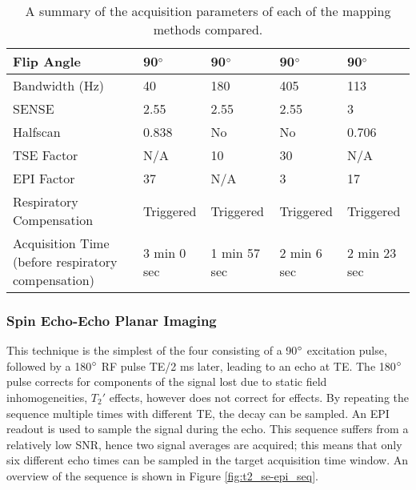 \begin{table}[H]
\begin{adjustbox}{width=1.0\textwidth, center}
\begin{tabularx}{1.25\textwidth}{X|X|X|X|X}
		Flip Angle                                           & 90$\degree$                     & 90$\degree$                & 90$\degree$        & 90$\degree$         \\ \hline
		Bandwidth   (Hz)                                     & 40                              & 180                        & 405                & 113                 \\ \hline
		SENSE                                                & 2.55                            & 2.55                       & 2.55               & 3                   \\ \hline
		Halfscan                                             & 0.838                           & No                         & No                 & 0.706               \\ \hline
		TSE Factor                                           & N/A                             & 10                         & 30                 & N/A                 \\ \hline
		EPI Factor                                           & 37                              & N/A                        & 3                  & 17                  \\ \hline
		Respiratory Compensation                             & Triggered                       & Triggered                  & Triggered          & Triggered           \\ \hline
		Acquisition Time \scriptsize{(before respiratory compensation)} & 3 min 0 sec                & 1 min 57 sec               & 2 min 6 sec        & 2 min 23 sec  
	\end{tabularx}
	\end{adjustbox}
	\caption{A summary of the acquisition parameters of each of the \ttwo mapping methods compared.}
	\label{tab:t2_sequence_overview}
\end{table}

\newpage
\subsubsection{Spin Echo-Echo Planar Imaging}
This technique is the simplest of the four consisting of a 90$\degree$ excitation pulse, followed by a 180$\degree$ \ac{RF} pulse \ac{TE}/2 ms later, leading to an echo at \ac{TE}. The 180$\degree$ pulse corrects for components of the signal lost due to static field inhomogeneities, $T_2'$ effects, however does not correct for \ttwo effects. By repeating the sequence multiple times with different \ac{TE}, the \ttwo decay can be sampled. An \ac{EPI} readout is used to sample the signal during the echo. This sequence suffers from a relatively low \ac{SNR}, hence two signal averages are acquired; this means that only six different echo times can be sampled in the target acquisition time window. An overview of the sequence is shown in Figure \ref{fig:t2_se-epi_seq}.

